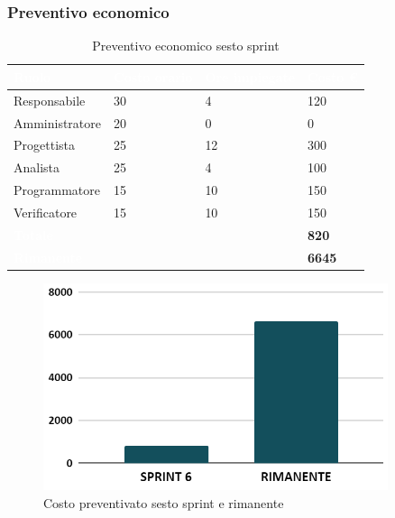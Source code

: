 \subsubsection{Preventivo economico}
{
\setlength{\tabcolsep}{10pt}
\renewcommand{\arraystretch}{1.5}
\begin{table}[h]
    \centering
    \begin{tabularx}{\textwidth}{| l | l | l | X |}
        \hline
        \rowcolor{headerrow} \textbf{\textcolor{white}{Ruolo}} & \textbf{\textcolor{white}{Costo orario}} & \textbf{\textcolor{white}{Ore impiegate}} & \textbf{\textcolor{white}{Costo €}} \\
        \hline
        Responsabile & 30 & 4 & 120\\
        \hline
        Amministratore & 20 & 0 & 0\\
        \hline
        Progettista& 25 & 12 & 300\\
        \hline
        Analista & 25 & 4 & 100\\
        \hline
        Programmatore & 15 & 10 & 150\\
        \hline
        Verificatore & 15 & 10 & 150\\
        \hline
        \cellcolor{headerrow} \textbf{\textcolor{white}{Totale}} &  &  & \textbf{820}\\
        \hline
        \cellcolor{headerrow} \textbf{\textcolor{white}{Rimanente}} &  &  & \textbf{6645}\\
        \hline
    \end{tabularx}
    \caption{Preventivo economico sesto sprint}
    \label{tab:preventivocostisestosprint}
\end{table}
}

\begin{figure}[h!]
    \centering
    \includegraphics[width=0.9\textwidth]{prev6costo.png}
    \caption{Costo preventivato sesto sprint e rimanente}
    \label{fig:preventivocostosestosprint}
\end{figure}


